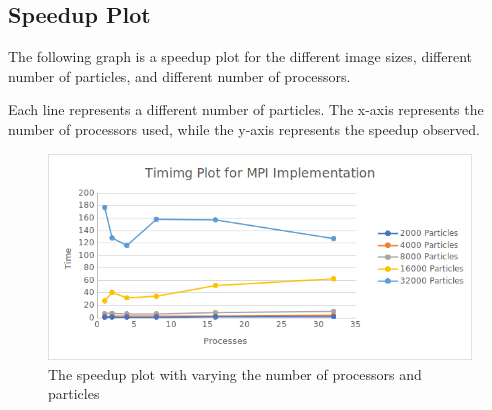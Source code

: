\documentclass{article}
\begin{document}
\subsection{Speedup Plot}
The following graph is a speedup plot for the different image sizes, different number of particles, and different number of processors.

Each line represents a different number of particles. The x-axis represents the number of processors used, while the y-axis represents the speedup observed.

\begin{figure}[H]
	\begin{center}
		\hspace*{-0.5cm}                                                           
  		\includegraphics[scale=0.83]{Report_Assets/timingmpi.png}
  	\end{center}
  	\caption{The speedup plot with varying the number of processors and particles}
\end{figure}
\end{document}
